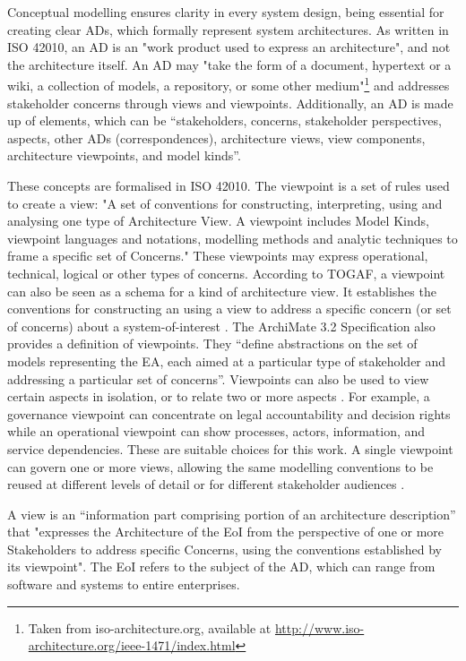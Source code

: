 Conceptual modelling ensures clarity in every system design, being essential for creating clear \ac{AD}s, which formally represent system architectures\cite{Pbol}. As written in ISO 42010, an \ac{AD} is an "work product used to express an architecture", and not the architecture itself. An \ac{AD} may "take the form of a document, hypertext or a wiki, a collection of models, a repository, or some other medium"\footnote{\label{fn:iso42010}Taken from iso-architecture.org, available at \url{http://www.iso-architecture.org/ieee-1471/index.html}} and addresses stakeholder concerns through views and viewpoints\cite{Pbol}. Additionally, an \ac{AD} is made up of elements, which can be ``stakeholders, concerns, stakeholder perspectives, aspects, other \ac{AD}s (correspondences), architecture views, view components, architecture viewpoints, and model kinds''\cite{ISO42010:2022}.

These concepts are formalised in ISO 42010. The viewpoint is a set of rules used to create a view: "A set of conventions for constructing, interpreting, using and analysing one type of Architecture View. A viewpoint includes Model Kinds, viewpoint languages and notations, modelling methods and analytic techniques to frame a specific set of Concerns." These viewpoints may express operational, technical, logical or other types of concerns. According to \ac{TOGAF}, a viewpoint can also be seen as a schema for a kind of architecture view. It establishes the conventions for constructing an using a view to address a specific concern (or set of concerns) about a system-of-interest \cite{TOGAF_Intro}. The ArchiMate 3.2 Specification also provides a definition of viewpoints. They ``define abstractions on the set of models representing the \ac{EA}, each aimed at a particular type of stakeholder and addressing a particular set of concerns''. Viewpoints can also be used to view certain aspects in isolation, or to relate two or more aspects \cite{opengroup}.
For example, a governance viewpoint can concentrate on legal accountability and decision rights while an operational viewpoint can show processes, actors, information, and service dependencies. These are suitable choices for this work. A single viewpoint can govern one or more views, allowing the same modelling conventions to be reused at different levels of detail or for different stakeholder audiences \cite{ISO42010:2022}.

A view is an ``information part comprising portion of an architecture description''\cite{ISO42010:2022} that "expresses the Architecture of the \ac{EoI} from the perspective of one or more Stakeholders to address specific Concerns, using the conventions established by its viewpoint". The \ac{EoI} refers to the subject of the \ac{AD}, which can range from software and systems to entire enterprises.

